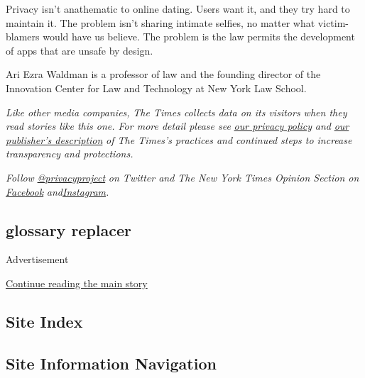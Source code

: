 Privacy isn't anathematic to online dating. Users want it, and they try
hard to maintain it. The problem isn't sharing intimate selfies, no
matter what victim-blamers would have us believe. The problem is the law
permits the development of apps that are unsafe by design.

Ari Ezra Waldman is a professor of law and the founding director of the
Innovation Center for Law and Technology at New York Law School.

\emph{Like other media companies,} \emph{The Times collects data on its
visitors when they read stories like this one. For more detail please
see}
\href{https://help.nytimes.com/hc/en-us/articles/115014892108-Privacy-policy?module=inline}{\emph{our
privacy policy}} \emph{and}
\href{https://www.nytimes.com/2019/04/10/opinion/sulzberger-new-york-times-privacy.html?rref=collection\%2Fspotlightcollection\%2Fprivacy-project-does-privacy-matter\&action=click\&contentCollection=opinion\&region=stream\&module=stream_unit\&version=latest\&contentPlacement=8\&pgtype=collection}{\emph{our
publisher's description}} \emph{of The Times's practices and continued
steps to increase transparency and protections.}

\emph{Follow}
\href{https://twitter.com/privacyproject}{\emph{@privacyproject}}
\emph{on Twitter and The New York Times Opinion Section on}
\href{https://www.facebook.com/nytopinion}{\emph{Facebook}}
\emph{and}\href{https://www.instagram.com/nytopinion/}{\emph{Instagram}}\emph{.}

\hypertarget{glossary-replacer}{%
\subsection{glossary replacer}\label{glossary-replacer}}

Advertisement

\protect\hyperlink{after-bottom}{Continue reading the main story}

\hypertarget{site-index}{%
\subsection{Site Index}\label{site-index}}

\hypertarget{site-information-navigation}{%
\subsection{Site Information
Navigation}\label{site-information-navigation}}

